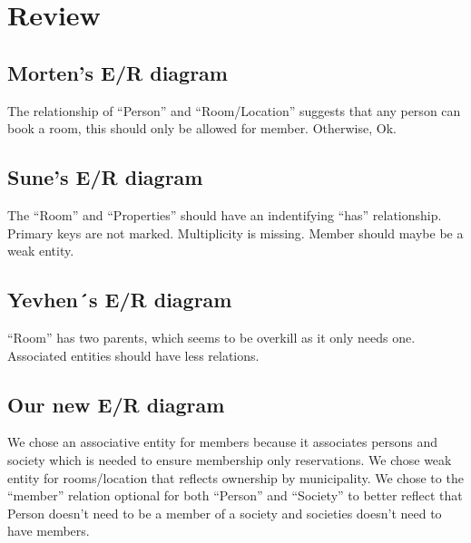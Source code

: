 \section{Review}
\subsection{Morten’s E/R diagram} 
The relationship of ``Person'' and ``Room/Location'' suggests that any person can book a room, this should only be allowed for member. Otherwise, Ok.

\subsection{Sune’s E/R diagram}
The ``Room'' and ``Properties'' should have an indentifying ``has'' relationship.
Primary keys are not marked. Multiplicity is missing. Member should maybe be a weak entity. 


\subsection{Yevhen´s E/R diagram}
``Room'' has two parents, which seems to be overkill as it only needs one. 
Associated entities should have less relations. 

\subsection{Our new E/R diagram}
We chose an associative entity for members because it associates persons and society which is needed 
to ensure membership only reservations.
We chose weak entity for rooms/location that reflects ownership by municipality. 
We chose to the ``member'' relation optional for both ``Person'' and ``Society''
to better reflect that Person doesn't need to be a member of a society and 
societies doesn't need to have members.

\newpage

